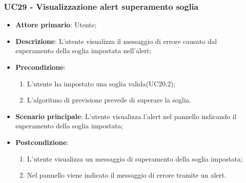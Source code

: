 \subsubsection{UC29 - Visualizzazione alert superamento soglia}
\label{sssec:uc29}
\begin{itemize}
  \item \textbf{Attore primario}: Utente;
  \item \textbf{Descrizione}: L'utente visualizza il messaggio di errore causato dal superamento della soglia impostata nell'alert;
  \item \textbf{Precondizione}:
  \begin{enumerate}
		\item L'utente ha impostato una soglia valida(UC20.2);
		\item L'algoritmo di previsione prevede di superare la soglia.
	\end{enumerate}
  \item \textbf{Scenario principale}:  L'utente visualizza l'alert nel pannello indicando il superamento della soglia impostata;
  \item \textbf{Postcondizione}:
  \begin{enumerate}
		\item L'utente visualizza un messaggio di superamento della soglia impostata;
		\item Nel pannello viene indicato il messaggio di errore tramite un alert.
	\end{enumerate}
\end{itemize}
